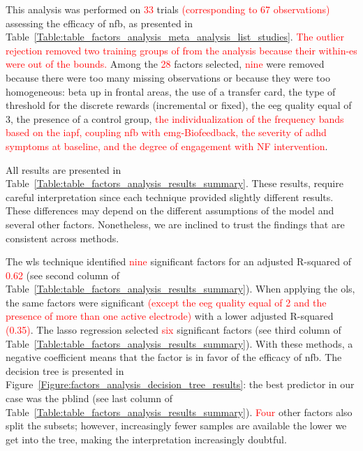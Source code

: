 This analysis was performed on \textcolor{red}{33} trials \textcolor{red}{(corresponding to 67 observations)} assessing the efficacy of \gls{nfb}, as presented 
in Table~\ref{Table:table_factors_analysis_meta_analysis_list_studies}. \textcolor{red}{The outlier rejection removed two training groups
of \citet{Bazanova2018} from the analysis because their within-\gls{es} were out of the bounds.} Among the \textcolor{red}{28} 
factors selected, \textcolor{red}{nine} were removed because there were too many missing observations or because they were too homogeneous: beta up in frontal areas, 
the use of a transfer card, the type of threshold for the discrete rewards (incremental or fixed), the \gls{eeg} quality equal of 3, the 
presence of a control group, \textcolor{red}{the individualization of the frequency bands based on the \gls{iapf}, coupling 
\gls{nfb} with \gls{emg}-Biofeedback, the severity of \gls{adhd} symptoms at baseline, and the degree of engagement with NF intervention}.  

All results are presented in Table~\ref{Table:table_factors_analysis_results_summary}. These results, require 
careful interpretation since each technique provided slightly different results. These differences 
may depend on the different assumptions of the model and several other factors. Nonetheless, we are inclined to 
trust the findings that are consistent across methods. 

The \gls{wls} technique identified \textcolor{red}{nine} significant factors for an adjusted R-squared of \textcolor{red}{0.62} (see second column of 
Table~\ref{Table:table_factors_analysis_results_summary}). 
When applying the \gls{ols}, the same factors were significant \textcolor{red}{(except the \gls{eeg} quality equal of 2 and the presence of more than one active electrode)}
with a lower adjusted R-squared \textcolor{red}{(0.35)}. The \gls{lasso} regression selected \textcolor{red}{six} significant factors (see third column of 
Table~\ref{Table:table_factors_analysis_results_summary}). With these methods, a negative coefficient means 
that the factor is in favor of the efficacy of \gls{nfb}. The decision tree is presented in Figure~\ref{Figure:factors_analysis_decision_tree_results}: 
the best predictor in our case was the \gls{pblind} (see last column of 
Table~\ref{Table:table_factors_analysis_results_summary}). \textcolor{red}{Four} other factors also split the subsets; however, 
increasingly fewer samples are available the lower we get into the tree, making the interpretation increasingly doubtful.  

